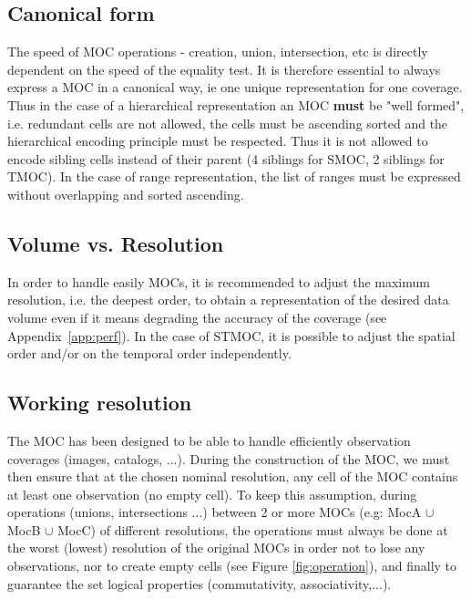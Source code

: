 \documentclass[11pt,a4paper]{ivoa}
\begin{document}
\subsection{Canonical form}

The speed of MOC operations - creation, union, intersection, etc
is directly dependent on the speed of the equality test. It is
therefore essential to always express a MOC in a canonical way, ie
one unique representation for one coverage. Thus in the case of a
hierarchical representation an MOC \textbf{must} be "well formed", i.e. 
redundant cells are not allowed, the cells must be ascending sorted
and the hierarchical encoding principle must be respected. Thus it
is not allowed to encode sibling cells instead of their parent (4
siblings for SMOC, 2 siblings for TMOC). In the case of range
representation, the list of ranges must be expressed without
overlapping and sorted ascending.


\subsection{Volume vs. Resolution}
In order to handle easily MOCs, it is recommended to adjust
the maximum resolution, i.e. the deepest order, to obtain a representation of
the desired data volume even if it means degrading the accuracy of the coverage
(see Appendix~\ref{app:perf}). In the case of STMOC, it is possible to adjust
the spatial order and/or on the temporal order independently.

\subsection{Working resolution}
The MOC has been designed to be able to handle efficiently observation
coverages (images, catalogs, ...). During the construction of the
MOC, we must then ensure that at the chosen nominal resolution, any cell
of the MOC contains at least one observation (no empty cell). To keep
this assumption, during operations (unions, intersections ...)
between 2 or more MOCs (e.g: MocA $\cup$ MocB $\cup$ MocC) of different
resolutions, the operations
must always be done at the worst (lowest) resolution of the original MOCs
in order not to lose any observations, nor to create empty cells (see
Figure \ref{fig:operation}), and finally to guarantee the set logical
properties (commutativity, associativity,...).
\end{document}
